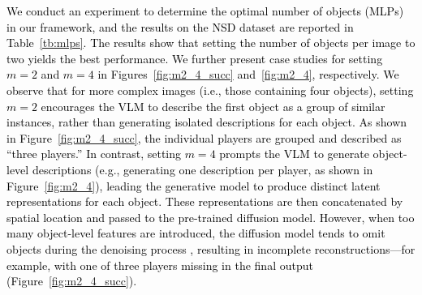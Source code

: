\begin{table}[]
\caption{Comparison of the number of objects in our framework. Results are reported using PixCorr, SSIM, LPIPS, CLIP, and Inception V3 metrics. The best result in each column is highlighted in \textcolor{red}{red}. $\uparrow$ indicates higher is better and $\downarrow$ indicates lower is better.}
\end{table}


\textcolor{black}{
We conduct an experiment to determine the optimal number of objects (MLPs) in our framework, and the results on the NSD dataset are reported in Table~\ref{tb:mlps}. The results show that setting the number of objects per image to two yields the best performance. We further present case studies for setting $m=2$ and $m=4$ in Figures~\ref{fig:m2_4_succ} and~\ref{fig:m2_4}, respectively. We observe that for more complex images (i.e., those containing four objects), setting 
$m=2$ encourages the VLM to describe the first object as a group of similar instances, rather than generating isolated descriptions for each object. As shown in Figure~\ref{fig:m2_4_succ}, the individual players are grouped and described as “three players.” In contrast, setting $m=4$ prompts the VLM to generate object-level descriptions (e.g., generating one description per player, as shown in Figure~\ref{fig:m2_4}), leading the generative model to produce distinct latent representations for each object. These representations are then concatenated by spatial location and passed to the pre-trained diffusion model. However, when too many object-level features are introduced, the diffusion model tends to omit objects during the denoising process \cite{liu2024correcting, wang2023imagen}, resulting in incomplete reconstructions—for example, with one of three players missing in the final output (Figure~\ref{fig:m2_4_succ}).
}






